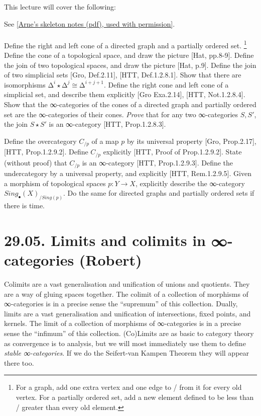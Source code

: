 \documentclass[a4paper]{amsart}
\numberwithin{figure}{section}
\theoremstyle{theorem}
\theoremstyle{definition}
\begin{document}
This lecture will cover the following: 

See \href{InfCat4JS.pdf}{[Arne's skeleton notes (pdf), used with permission]}. \\%
\\ 

Define the right and left cone of a directed graph and a partially ordered set.%
\footnote{For a graph, add one extra vertex and one edge to / from it for every old vertex. For a partially ordered set, add a new element defined to be less than / greater than every old element.} %
Define the cone of a topological space, and draw the picture [Hat, pp.8-9]. %
Define the join of two topological spaces, and draw the picture [Hat, p.9]. %
Define the join of two simplicial sets [Gro, Def.2.11], [HTT, Def.1.2.8.1]. %
Show that there are isomorphisms $∆^{i} {\star} ∆^{j} \cong ∆^{i+j+1}$. %
Define the right cone and left cone of a simplicial set, and describe them explicitly [Gro Exa.2.14], [HTT, Not.1.2.8.4]. %
Show that the ∞-categories of the cones of a directed graph and partially ordered set are the ∞-categories of their cones. %
\emph{Prove} that for any two ∞-categories $S, S'$, the join $S \star S'$ is an ∞-category [HTT, Prop.1.2.8.3]. %

Define the overcategory  $C_{/p}$ of a map $p$ by its universal property [Gro, Prop.2.17], [HTT, Prop.1.2.9.2]. %
Define $C_{/p}$  explicitly [HTT, Proof of Prop.1.2.9.2]. %
State (without proof) that $C_{/p}$ is an ∞-category [HTT, Prop.1.2.9.3]. %
Define the undercategory by a universal property, and explicitly [HTT, Rem.1.2.9.5]. %
Given a morphism of topological spaces $p: Y \to X$, explicitly describe the ∞-category $Sing_\bullet(X)_{/Sing(p)}$. %
Do the same for directed graphs and partially ordered sets if there is time.



\section{29.05. Limits and colimits in ∞-categories (Robert)}

Colimits are a vast generalisation and unification of unions and quotients. They are a way of gluing spaces together. The colimit of a collection of morphisms of ∞-categories is in a precise sense the ``supremum'' of this collection. %
Dually, limits are a vast generalisation and unification of intersections, fixed points, and kernels. The limit of a collection of morphisms of ∞-categories is in a precise sense the ``infimum'' of this collection. %
(Co)Limits are as basic to category theory as convergence is to analysis, but we will most immediately use them to define \emph{stable ∞-categories}. %
If we do the Seifert-van Kampen Theorem they will appear there too.
\end{document}
